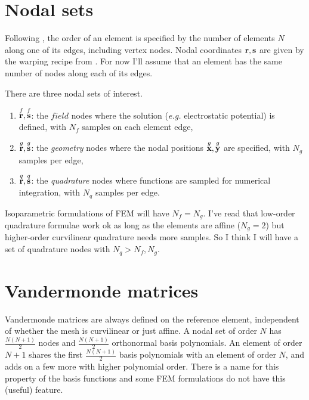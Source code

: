 \section{Nodal sets}

Following \cite{hesthaven2007nodal}, the order of an element is specified by the number of elements $N$ along one of its edges, including vertex nodes.  Nodal coordinates $\textbf{r}, \textbf{s}$ are given by the warping recipe from \cite{hesthaven2007nodal}.  For now I'll assume that an element has the same number of nodes along each of its edges.

There are three nodal sets of interest.
%
\begin{enumerate}
  \item $\overset{f}{\textbf{r}}, \overset{f}{\textbf{s}}$: the $field$ nodes where the solution (\emph{e.g.} electrostatic potential) is defined, with $N_f$ samples on each element edge,
  \item $\overset{g}{\textbf{r}}, \overset{g}{\textbf{s}}$: the \emph{geometry} nodes where the nodal positions $\overset{g}{\textbf{x}}, \overset{g}{\textbf{y}}$ are specified, with $N_g$ samples per edge,
  \item $\overset{q}{\textbf{r}}, \overset{q}{\textbf{s}}$: the \emph{quadrature} nodes where functions are sampled for numerical integration, with $N_q$ samples per edge.
\end{enumerate}
%
Isoparametric formulations of FEM will have $N_f = N_g$.  I've read that low-order quadrature formulae work ok as long as the elements are affine ($N_g = 2$) but higher-order curvilinear quadrature needs more samples.  So I think I will have a set of quadrature nodes with $N_q > N_f, N_g$.

\section{Vandermonde matrices}

Vandermonde matrices are always defined on the reference element, independent of whether the mesh is curvilinear or just affine.  A nodal set of order $N$ has $\frac{N(N+1)}{2}$ nodes and $\frac{N(N+1)}{2}$ orthonormal basis polynomials.  An element of order $N+1$ shares the first $\frac{N(N+1)}{2}$ basis polynomials with an element of order $N$, and adds on a few more with higher polynomial order.  There is a name for this property of the basis functions and some FEM formulations do not have this (useful) feature.

